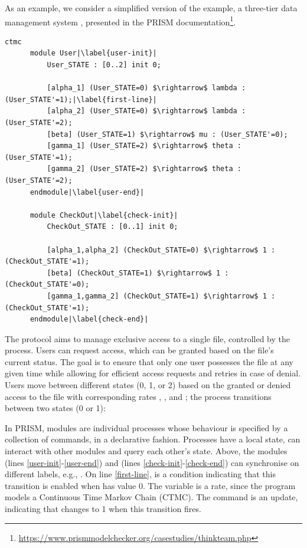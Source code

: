 As an example, we consider a simplified version of the
 example, a three-tier data management system
\cite{DBLP:journals/entcs/BeekMLGFS05}, presented in the PRISM
documentation\footnote{\url{https://www.prismmodelchecker.org/casestudies/thinkteam.php}}.
%
\begin{lstlisting}[style=prism-color,% caption={A PRISM example},captionpos=b,
	frame=none,label={example1},escapechar=|]
	  ctmc 
	  module User|\label{user-init}|
		  User_STATE : [0..2] init 0;
	  
		  [alpha_1] (User_STATE=0) $\rightarrow$ lambda : (User_STATE'=1);|\label{first-line}|
		  [alpha_2] (User_STATE=0) $\rightarrow$ lambda : (User_STATE'=2);
		  [beta] (User_STATE=1) $\rightarrow$ mu : (User_STATE'=0);
		  [gamma_1] (User_STATE=2) $\rightarrow$ theta : (User_STATE'=1);
		  [gamma_2] (User_STATE=2) $\rightarrow$ theta : (User_STATE'=2);
	  endmodule|\label{user-end}|
	  
	  module CheckOut|\label{check-init}|
		  CheckOut_STATE : [0..1] init 0;
	  
		  [alpha_1,alpha_2] (CheckOut_STATE=0) $\rightarrow$ 1 : (CheckOut_STATE'=1);
		  [beta] (CheckOut_STATE=1) $\rightarrow$ 1 : (CheckOut_STATE'=0);
		  [gamma_1,gamma_2] (CheckOut_STATE=1) $\rightarrow$ 1 : (CheckOut_STATE'=1);
	  endmodule|\label{check-end}|
  \end{lstlisting}
  The protocol aims to manage exclusive access to a single file,
  controlled by the  process. Users can request
  access, which can be granted based on the file's current status. The
  goal is to ensure that only one user possesses the file at any given
  time while allowing for efficient access requests and retries in
  case of denial. Users move between different states (0, 1, or 2)
  based on the granted or denied access to the file with corresponding
  rates , , and ; the
   process transitions between two states (0 or
  1):

In PRISM, modules are individual processes whose behaviour is
specified by a collection of commands, in a declarative fashion.
Processes have a local state, can interact with other modules and
query each other's state. Above, the modules  (lines
\ref{user-init}-\ref{user-end}) and  (lines
\ref{check-init}-\ref{check-end}) can synchronise on different labels, e.g., 
. 
On line \ref{first-line},  is a condition
indicating that this transition is enabled when 
has value 0. The variable  is a rate, since the
program models a Continuous Time Markov Chain (CTMC). The command
 is an update, indicating that
 changes to 1 when this transition fires.

